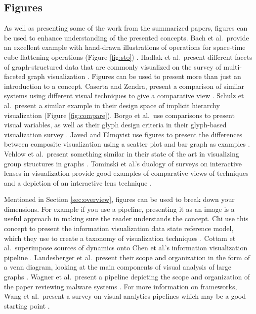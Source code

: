 \subsection{Figures}
As well as presenting some of the work from the summarized papers, figures can be used to enhance understanding of the presented concepts. Bach et al.\ provide an excellent example with hand-drawn illustrations of operations for space-time cube flattening operations (Figure \ref{fig:sto}) \cite{bach2014review}. Hadlak et al.\ present different facets of graph-structured data that are commonly visualized on the survey of multi-faceted graph visualization \cite{hadlak2015survey}. Figures can be used to present more than just an introduction to a concept. Caserta and Zendra, present a comparison of similar systems using different visual techniques to give a comparative view \cite{caserta2011visualization}. Schulz et al.\ present a similar example in their design space of implicit hierarchy visualization \cite{schulz2011design} (Figure \ref{fig:compare}). Borgo et al.\ use comparisons to present visual variables, as well as their glyph design criteria in their glyph-based visualization survey \cite{borgo2013glyph}.  Javed and Elmqvist use figures to present the differences between composite visualization using a scatter plot and bar graph as examples \cite{javed2012exploring}. Vehlow et al.\ present something similar in their state of the art in visualizing group structures in graphs \cite{vehlow2015state}. Tominski et al.'s duology of surveys on interactive lenses in visualization provide good examples of comparative views of techniques and a depiction of an interactive lens technique \cite{tominski2014survey,tominski2016interactive}.

Mentioned in Section \ref{sec:overview}, figures can be used to break down your dimensions. For example if you use a pipeline, presenting it as an image is a useful approach in making sure the reader understands the concept. Chi use this concept to present the information visualization data state reference model, which they use to create a taxonomy of visualization techniques \cite{chi2000taxonomy}. Cottam et al.\ superimpose sources of dynamics onto Chen et al.'s information visualization pipeline \cite{cottam2012watch,card1999readings}. Landesberger et al.\ present their scope and organization in the form of a venn diagram, looking at the main components of visual analysis of large graphs \cite{von2011visual}. Wagner et al.\ present a pipeline depicting the scope and organization of the paper reviewing malware systems \cite{wagner2015survey}. 
For more information on frameworks, Wang et al.\ present a survey on visual analytics pipelines which may be a good starting point \cite{wang2016survey}.

